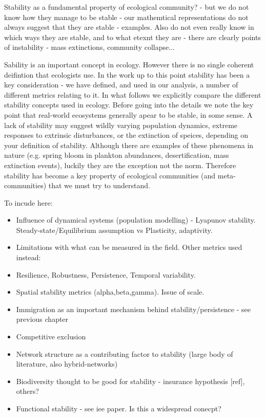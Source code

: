Stability as a fundamental property of ecological community? - but we do not know how they manage to be stable - our mathemtical representations do not always suggest that they are stable - examples. Also do not even really know in which ways they are stable, and to what etexnt they are - there are clearly points of instability - mass extinctions, community collapse... 

Sability is an important concept in ecology. However there is no single coherent deifintion that ecologists use. In the work up to this point stability has been a key consideration - we have defined, and used in our analysis, a number of different metrics relating to it. In what follows we explicitly compare the different stability concepts used in ecology. Before going into the details we note the key point that real-world ecosystems generally apear to be stable, in some sense. A lack of stability may suggest wildly varying population dynamics, extreme responses to extrinsic disturbances, or the extinction of speices, depending on your definition of stability. Although there are examples of these phenomena in nature (e.g. spring bloom in plankton abundances, desertification, mass extinction events), luckily they are the exception not the norm. Therefore stability has become a key property of ecological communities (and meta-communities) that we must try to understand. 


To incude here:

\begin{itemize}

\item Influence of dynamical systems (population modelling) - Lyapunov stability. Steady-state/Equilibrium assumption vs Plasticity, adaptivity.

\item Limitations with what can be measured in the field. Other metrics used instead: 

\item Resilience, Robustness, Persistence, Temporal variability. 

\item Spatial stability metrics (alpha,beta,gamma). Issue of scale. \cite{wang2014ecosystem}

\item Immigration as an important mechanism behind stability/persistence - see previous chapter

\item Competitive exclusion

\item Network structure as a contributing factor to stability (large body of literature, also hybrid-networks)

\item Biodiversity thought to be good for stability - insurance hypothesis [ref], others?

\item Functional stability - see iee paper. Is this a widespread conecpt?
\end{itemize}


